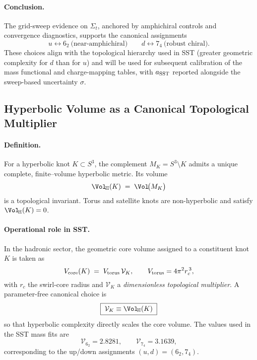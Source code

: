 \paragraph{Conclusion.}
The grid-sweep evidence on $\Sigma_t$, anchored by amphichiral controls and convergence diagnostics, supports the canonical assignments
\[
    \boxed{u\!\leftrightarrow\!6_2\ \text{(near-amphichiral)}\qquad d\!\leftrightarrow\!7_4\ \text{(robust chiral)}.}
\]
These choices align with the topological hierarchy used in SST (greater geometric complexity for $d$ than for $u$) and will be used for subsequent calibration of the mass functional and charge-mapping tables, with $a_{\rm SST}$ reported alongside the sweep-based uncertainty $\sigma$.

\subsection*{Hyperbolic Volume as a Canonical Topological Multiplier}
\label{sec:hyp-volume}

\paragraph{Definition.}
For a hyperbolic knot \(K\subset S^3\), the complement \(M_K=S^3\!\setminus\!K\) admits a unique complete, finite–volume hyperbolic metric. Its volume
\[
    \Vol_{\!\mathbb{H}}(K)\;=\;\Vol\!\big(M_K\big)
\]
is a topological invariant. Torus and satellite knots are non-hyperbolic and satisfy \(\Vol_{\!\mathbb{H}}(K)=0\).

\paragraph{Operational role in SST.}
In the hadronic sector, the geometric core volume assigned to a constituent knot \(K\) is taken as
\[
    V_{\text{core}}(K)\;=\;V_{\rm torus}\,\mathcal{V}_K,
    \qquad
    V_{\rm torus}=4\pi^2 r_c^{\,3},
\]
with \(r_c\) the swirl-core radius and \(\mathcal{V}_K\) a \emph{dimensionless topological multiplier}. A parameter-free canonical choice is
\[
    \boxed{\;\mathcal{V}_K \equiv \Vol_{\!\mathbb{H}}(K)\;}
\]
so that hyperbolic complexity directly scales the core volume. The values used in the SST mass fits are
\[
    \mathcal{V}_{6_2}=2.8281,\qquad
    \mathcal{V}_{7_4}=3.1639,
\]
corresponding to the up/down assignments \((u,d)=(6_2,7_4)\).

